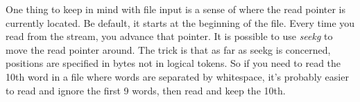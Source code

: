 \documentclass[]{tufte-handout}
\begin{document}
One thing to keep in mind with file input is a sense of where the read pointer is currently located.  Be default, it starts at the beginning of the file.  Every time you read from the stream, you advance that pointer.  It is possible to use \textit{seekg} to move the read pointer around. The trick is that as far as seekg is concerned, positions are specified in bytes not in logical tokens.  So if you need to read the 10th word in a file where words are separated by whitespace, it's probably easier to read and ignore the first 9 words, then read and keep the 10th.
\end{document}
